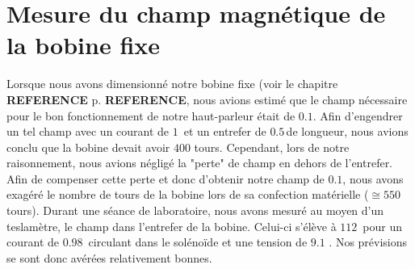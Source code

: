 \section{Mesure du champ magnétique de la bobine fixe}

Lorsque nous avons dimensionné notre bobine fixe (voir le chapitre \textbf{REFERENCE} p. \textbf{REFERENCE}, nous avions estimé que le champ nécessaire pour le bon fonctionnement de notre haut-parleur était de $0.1$\tesla.  Afin d'engendrer un tel champ avec un courant de $1$\ampere \, et un entrefer de $0.5$\centi\meter \,de longueur, nous avions conclu que la bobine devait avoir $400$ tours. Cependant, lors de notre raisonnement, nous avions négligé la "perte" de champ en dehors de l'entrefer. Afin de compenser cette perte et donc d'obtenir notre champ de $0.1$\tesla, nous avons exagéré le nombre de tours de la bobine lors de sa confection matérielle ($\cong 550$ tours). 
Durant une séance de laboratoire, nous avons mesuré au moyen d'un teslamètre, le champ dans l'entrefer de la bobine. Celui-ci s'élève à $112$\milli \tesla \, pour un courant de $0.98$ \ampere \,circulant dans le solénoïde et une tension de $9.1$ \volt. Nos prévisions se sont donc avérées relativement bonnes.

